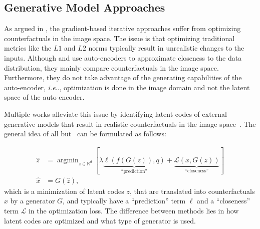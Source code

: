 \documentclass[11pt,a4paper,twoside,openright,final]{memoir}
\makeatletter
\DeclareMathOperator*{\argmin}{\arg\min}
\DeclareRobustCommand\onedot{\futurelet\@let@token\@onedot}
\def\@onedot{\ifx\@let@token.\else.\null\fi\xspace}
\def\ie{\emph{i.e}\onedot} \def\Ie{\emph{I.e}\onedot}
\makeatother
\begin{document}
\subsection{Generative Model Approaches} 
As argued in \cite{Rodriguez2021}, the gradient-based iterative approaches suffer from optimizing counterfactuals in the image space.
The issue is that optimizing traditional metrics like the $L1$ and $L2$ norms typically result in unrealistic changes to the inputs. 
Although \cite{Dhurandhar2018} and \cite{VanLooveren2019} use auto-encoders to approximate closeness to the data distribution, they mainly compare counterfactuals in the image space.
Furthermore, they do not take advantage of the generating capabilities of the auto-encoder, \ie, optimization is done in the image domain and not the latent space of the auto-encoder. 


 
Multiple works alleviate this issue by identifying latent codes of external generative models that result in realistic counterfactuals in the image space~\cite{Joshi2018, Rodriguez2021, Singla2019, flowcounterfactuals}.
The general idea of all but~\cite{Singla2019} can be formulated as follows: 

\begin{align}\label{eq:generator-cf}
    \hat z &= \argmin_{z\in \mathbb{R}^d} [ 
        \lambda   \underbrace{\ell(f(G(z)) , q)}_{\text{``prediction''}}
        +            \underbrace{\mathcal{L}(x , G(z))}_{\text{``closeness''}}]\\
    \hat x &= G(\hat z),
\end{align} 
which is a minimization of latent codes $z$, that are translated into counterfactuals $\hat x$ by a generator $G$, and typically have a ``prediction'' term $\ell$ and a ``closeness'' term $\mathcal{L}$ in the optimization loss.
The difference between methods lies in how latent codes are optimized and what type of generator is used. 
\end{document}
